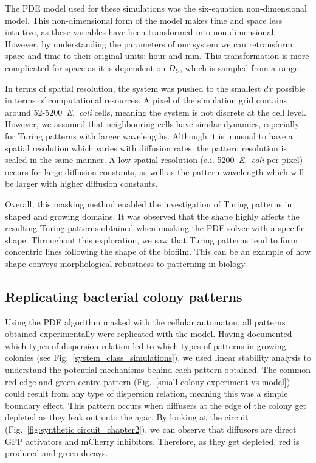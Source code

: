 The PDE model used for these simulations was the six-equation non-dimensional model.
This non-dimensional form of the model makes time and space less intuitive, as these variables have been transformed into non-dimensional.
However, by understanding the parameters of our system we can retransform space and time to their original units: hour and mm.
This transformation is more complicated for space as it is dependent on $D_{U}$, which is sampled from a range.

In terms of spatial resolution, the system was pushed to the smallest $dx$ possible in terms of computational resources.
A pixel of the simulation grid contains around 52-5200~\textit{E.~coli} cells, meaning the system is not discrete at the cell level.
However, we assumed that neighbouring cells have similar dynamics, especially for Turing patterns with larger wavelengths.
Although it is unusual to have a spatial resolution which varies with diffusion rates, the pattern resolution is scaled in the same manner.
A low spatial resolution (e.i. 5200~\textit{E.~coli} per pixel) occurs for large diffusion constants, as well as the pattern wavelength which will be larger with higher diffusion constants.

Overall, this masking method enabled the investigation of Turing patterns in shaped and growing domains.
It was observed that the shape highly affects the resulting Turing patterns obtained when masking the PDE solver with a specific shape.
Throughout this exploration, we saw that Turing patterns tend to form concentric lines following the shape of the biofilm.
This can be an example of how shape conveys morphological robustness to patterning in biology.


\subsection{Replicating bacterial colony patterns}
Using the PDE algorithm masked with the cellular automaton, all patterns obtained experimentally were replicated with the model.
Having documented which types of dispersion relation led to which types of patterns in growing colonies (see Fig.~\ref{system_class_simulations}), we used linear stability analysis to understand the potential mechanisms behind each pattern obtained.
The common red-edge and green-centre pattern (Fig.~\ref{small colony experiment vs model}) could result from any type of dispersion relation, meaning this was a simple boundary effect.
This pattern occurs when diffusers at the edge of the colony get depleted as they leak out onto the agar.
By looking at the circuit (Fig.~\ref{fig:synthetic circuit_chapter2}), we can observe that diffusors are direct GFP activators and mCherry inhibitors.
Therefore, as they get depleted, red is produced and green decays.

